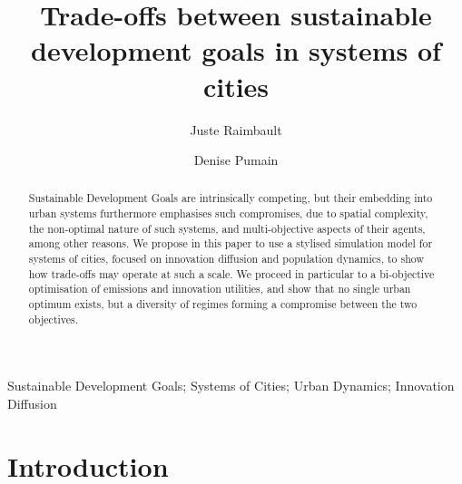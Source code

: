 \documentclass[final,5p,times,twocolumn,authoryear]{elsarticle}
\begin{document}
\begin{frontmatter}

\title{Trade-offs between sustainable development goals in systems of cities}

\author[label1]{Juste Raimbault}
\author[label2]{Denise Pumain}


\address[label1]{CASA, University College London}
\address[label2]{G{\'e}ographie-cit{\'e}s, Universit{\'e} Paris 1}





\begin{abstract}
    Sustainable Development Goals are intrinsically competing, but their embedding into urban systems furthermore emphasises such compromises, due to spatial complexity, the non-optimal nature of such systems, and multi-objective aspects of their agents, among other reasons. We propose in this paper to use a stylised simulation model for systems of cities, focused on innovation diffusion and population dynamics, to show how trade-offs may operate at such a scale. We proceed in particular to a bi-objective optimisation of emissions and innovation utilities, and show that no single urban optimum exists, but a diversity of regimes forming a compromise between the two objectives.
\end{abstract}

\begin{keyword}
Sustainable Development Goals; Systems of Cities; Urban Dynamics; Innovation Diffusion
\end{keyword}

\end{frontmatter}

\linenumbers



\section{Introduction}
\end{document}
